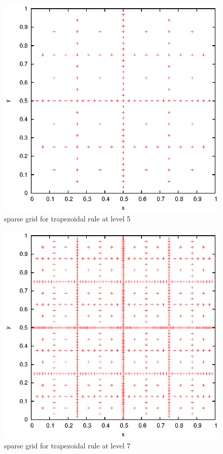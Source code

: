 \documentclass[]{article}
\begin{document}
\begin{figure}[!ht]
\includegraphics[width=.9\textwidth]{task11_trap_5}
\caption{sparse grid for trapezoidal rule at level 5}
\label{fig:Task11c}
\end{figure}

\begin{figure}[!ht]
\includegraphics[width=.9\textwidth]{task11_trap_7}
\caption{sparse grid for trapezoidal rule at level 7}
\label{fig:Task11d}
\end{figure}
\clearpage
\end{document}
